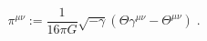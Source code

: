 \begin{equation}
\pi ^{\mu \nu }:=\frac{1}{16\pi G}\sqrt{-\gamma }\left( \Theta \gamma ^{\mu
\nu }-\Theta ^{\mu \nu }\right) \;.  \label{Pi}
\end{equation}

